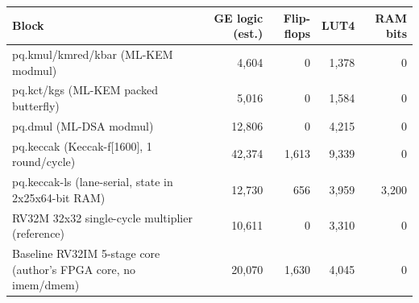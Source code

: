 \begin{tabular}{lrrrr}\toprule
Block & GE logic (est.) & Flip-flops & LUT4 & RAM bits \\\midrule
pq.kmul/kmred/kbar (ML-KEM modmul) & 4,604 & 0 & 1,378 & 0 \\
pq.kct/kgs (ML-KEM packed butterfly) & 5,016 & 0 & 1,584 & 0 \\
pq.dmul (ML-DSA modmul) & 12,806 & 0 & 4,215 & 0 \\
pq.keccak (Keccak-f[1600], 1 round/cycle) & 42,374 & 1,613 & 9,339 & 0 \\
pq.keccak-ls (lane-serial, state in 2x25x64-bit RAM) & 12,730 & 656 & 3,959 & 3,200 \\
RV32M 32x32 single-cycle multiplier (reference) & 10,611 & 0 & 3,310 & 0 \\
Baseline RV32IM 5-stage core (author's FPGA core, no imem/dmem) & 20,070 & 1,630 & 4,045 & 0 \\
\bottomrule
\end{tabular}
